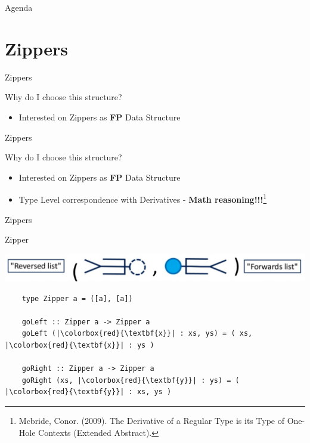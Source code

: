 \documentclass{beamer}
\begin{document}
\begin{frame}{Agenda}
  \section{Zippers}
  \tableofcontents[currentsection]
\end{frame}


\begin{frame}[fragile]{Zippers}

  \begin{block}{Why do I choose this structure?}
    \begin{itemize}
      \item Interested on Zippers as \textbf{FP} Data Structure
    \end{itemize}
  \end{block}

\end{frame}

\begin{frame}[fragile]{Zippers}

  \begin{block}{Why do I choose this structure?}
    \begin{itemize}
      \item Interested on Zippers as \textbf{FP} Data Structure
      \item Type Level correspondence with Derivatives - \textbf{Math reasoning!!!}\footnote{Mcbride, Conor. (2009). The Derivative of a Regular Type is its Type of One-Hole Contexts (Extended Abstract).}
    \end{itemize}
  \end{block}

\end{frame}

\begin{frame}[fragile]{Zippers}

 \begin{block}{Zipper}

  \begin{minipage}[t]{\linewidth}
    \includegraphics[width=\textwidth]{zipper_1}
  \end{minipage}

  \begin{verbatim}
    type Zipper a = ([a], [a])

    goLeft :: Zipper a -> Zipper a
    goLeft (|\colorbox{red}{\textbf{x}}| : xs, ys) = ( xs, |\colorbox{red}{\textbf{x}}| : ys )

    goRight :: Zipper a -> Zipper a
    goRight (xs, |\colorbox{red}{\textbf{y}}| : ys) = ( |\colorbox{red}{\textbf{y}}| : xs, ys )
  \end{verbatim}


\end{block}

\end{frame}
\end{document}

